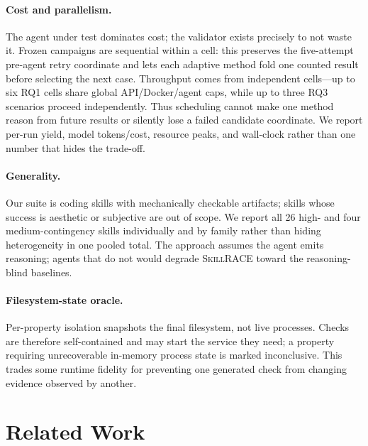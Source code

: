 \documentclass[acmsmall,screen,review,anonymous]{acmart}
\newcommand{\tool}{\textsc{SkillRACE}\xspace}
\begin{document}
\paragraph{Cost and parallelism.} The agent under test dominates cost; the validator
exists precisely to not waste it. Frozen campaigns are sequential within a cell: this
preserves the five-attempt pre-agent retry coordinate and lets each adaptive method fold
one counted result before selecting the next case. Throughput comes from independent
cells---up to six RQ1 cells share global API/Docker/agent caps, while up to three RQ3
scenarios proceed independently. Thus scheduling cannot make one method reason from
future results or silently lose a failed candidate coordinate. We report per-run yield,
model tokens/cost, resource peaks, and wall-clock rather than one number that hides the
trade-off.

\paragraph{Generality.} Our suite is coding skills with mechanically checkable artifacts;
skills whose success is aesthetic or subjective are out of scope. We report all 26
high- and four medium-contingency skills individually and by family rather than hiding
heterogeneity in one pooled total. The approach assumes the agent emits reasoning;
agents that do not would degrade
\tool toward the reasoning-blind baselines.

\paragraph{Filesystem-state oracle.} Per-property isolation snapshots the final
filesystem, not live processes. Checks are therefore self-contained and may start the
service they need; a property requiring unrecoverable in-memory process state is marked
inconclusive. This trades some runtime fidelity for preventing one generated check from
changing evidence observed by another.

\section{Related Work}
\label{sec:related}
\end{document}
